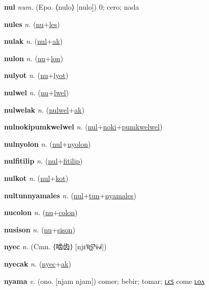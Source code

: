 \textbf{\hypertarget{nul}{nul}} \textit{num.} (Epo. ⟨nulo⟩ [nulo])
0; cero; nada

\textbf{\hypertarget{nules}{nules}} \textit{n.} (\hyperlink{nu}{nu}+\allowbreak \hyperlink{les}{les})


\textbf{\hypertarget{nulak}{nulak}} \textit{n.} (\hyperlink{nul}{nul}+\allowbreak \hyperlink{ak}{ak})


\textbf{\hypertarget{nulon}{nulon}} \textit{n.} (\hyperlink{nu}{nu}+\allowbreak \hyperlink{lon}{lon})


\textbf{\hypertarget{nulyot}{nulyot}} \textit{n.} (\hyperlink{nu}{nu}+\allowbreak \hyperlink{lyot}{lyot})


\textbf{\hypertarget{nulwel}{nulwel}} \textit{n.} (\hyperlink{nu}{nu}+\allowbreak \hyperlink{lwel}{lwel})


\textbf{\hypertarget{nulwelak}{nulwelak}} \textit{n.} (\hyperlink{nulwel}{nulwel}+\allowbreak \hyperlink{ak}{ak})


\textbf{\hypertarget{nulnokipumkwelwel}{nulnokipumkwelwel}} \textit{n.} (\hyperlink{nul}{nul}+\allowbreak \hyperlink{noki}{noki}+\allowbreak \hyperlink{pumkwelwel}{pumkwelwel})


\textbf{\hypertarget{nulnyolon}{nulnyolon}} \textit{n.} (\hyperlink{nul}{nul}+\allowbreak \hyperlink{nyolon}{nyolon})


\textbf{\hypertarget{nulfitilip}{nulfitilip}} \textit{n.} (\hyperlink{nul}{nul}+\allowbreak \hyperlink{fitilip}{fitilip})


\textbf{\hypertarget{nulkot}{nulkot}} \textit{n.} (\hyperlink{nul}{nul}+\allowbreak \hyperlink{kot}{kot})


\textbf{\hypertarget{nultunnyamales}{nultunnyamales}} \textit{n.} (\hyperlink{nul}{nul}+\allowbreak \hyperlink{tun}{tun}+\allowbreak \hyperlink{nyamales}{nyamales})


\textbf{\hypertarget{nucolon}{nucolon}} \textit{n.} (\hyperlink{nu}{nu}+\allowbreak \hyperlink{colon}{colon})


\textbf{\hypertarget{nusison}{nusison}} \textit{n.} (\hyperlink{nu}{nu}+\allowbreak \hyperlink{sison}{sison})


\textbf{\hypertarget{nyec}{nyec}} \textit{n.} (Cmn. ⟨{\chinese{}啮齿}⟩ [njɛ˥˩ʈ͡ʂʰɨ˧˩˧])


\textbf{\hypertarget{nyecak}{nyecak}} \textit{n.} (\hyperlink{nyec}{nyec}+\allowbreak \hyperlink{ak}{ak})


\textbf{\hypertarget{nyama}{nyama}} \textit{v.} (ono. [njam njam])
comer; bebir; tomar; \hyperlink{nyamales}{ʟєꜱ} come \hyperlink{nyamalon}{ʟᴏᴧ}

